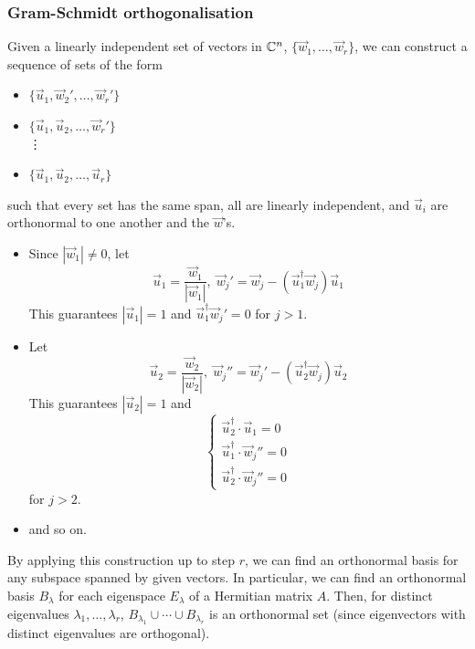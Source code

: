 \documentclass{../../template/note}
\begin{document}
    \subsubsection{Gram-Schmidt orthogonalisation}

    Given a linearly independent set of vectors in \(\mathbb C^n\), \(\{\vec w_1, \dots, \vec w_r\}\), we can construct a sequence of sets of the form
    \begin{itemize}
        \item \(\{\vec u_1, \vec w_2', \dots, \vec w_r'\}\)
        \item \(\{\vec u_1, \vec u_2, \dots, \vec w_r'\}\) \\[5pt]
        \vdots
        \item \(\{\vec u_1, \vec u_2, \dots, \vec u_r\}\)
    \end{itemize}
    such that every set has the same span, all are linearly independent, and \(\vec u_i\) are orthonormal to one another and the \(\vec w\)'s.
    
    \begin{algorithm}
        \begin{itemize}
            \item Since \(|\vec w_1| \neq 0\), let
            \[
                \vec u_1 = \frac{\vec w_1}{|\vec w_1|}, \; \vec w_j' = \vec w_j - (\vec u_1^\dagger \vec w_j)\vec u_1
            \]
            This guarantees \(|\vec u_1| = 1\) and \(\vec u_1^\dagger \vec w_j' = 0\) for \(j > 1\).
            \item Let 
            \[
                \vec u_2 = \frac{\vec w_2}{|\vec w_2|}, \; \vec w_j'' = \vec w_j' - (\vec u_2^\dagger \vec w_j)\vec u_2
            \]
            This guarantees \(|\vec u_2| = 1\) and
            \[
                \begin{cases}
                    \vec u_2^\dagger \cdot \vec u_1 = 0 \\
                    \vec u_1^\dagger \cdot \vec w_j'' = 0 \\
                    \vec u_2^\dagger \cdot \vec w_j'' = 0
                \end{cases}
            \]
            for \(j > 2\).
            \item and so on.
        \end{itemize}
    \end{algorithm}
    
    By applying this construction up to step \(r\), we can find an orthonormal basis for any subspace spanned by given vectors. In particular, we can find an orthonormal basis \(B_\lambda\) for each eigenspace \(E_\lambda\) of a Hermitian matrix \(A\). Then, for distinct eigenvalues \(\lambda_1, \dots, \lambda_r\), \(B_{\lambda_1} \cup \cdots \cup B_{\lambda_r}\) is an orthonormal set (since eigenvectors with distinct eigenvalues are orthogonal).
\end{document}
